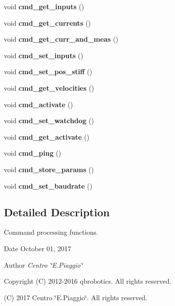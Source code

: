 \begin{DoxyCompactItemize}
void {\bfseries cmd\+\_\+get\+\_\+inputs} ()
\item 
\mbox{\label{command__processing_8h_aaf613e251c1e14fe4fffe3e9e033f9f7}} 
void {\bfseries cmd\+\_\+get\+\_\+currents} ()
\item 
\mbox{\label{command__processing_8h_a45a90a8455bfdb6a7f0e118da2c6f0a6}} 
void {\bfseries cmd\+\_\+get\+\_\+curr\+\_\+and\+\_\+meas} ()
\item 
\mbox{\label{command__processing_8h_a2d8a4542f55af960a27f875b00aad6a1}} 
void {\bfseries cmd\+\_\+set\+\_\+inputs} ()
\item 
\mbox{\label{command__processing_8h_a7897817859ac33d5a20b710af0f6a044}} 
void {\bfseries cmd\+\_\+set\+\_\+pos\+\_\+stiff} ()
\item 
\mbox{\label{command__processing_8h_a212883283bd7a8f32846615271cad8ce}} 
void {\bfseries cmd\+\_\+get\+\_\+velocities} ()
\item 
\mbox{\label{command__processing_8h_a107fc9f2982f9a953bdd82aa07279499}} 
void {\bfseries cmd\+\_\+activate} ()
\item 
\mbox{\label{command__processing_8h_aa94cd9c2e2fbfc5b98e84f67569cfe82}} 
void {\bfseries cmd\+\_\+set\+\_\+watchdog} ()
\item 
\mbox{\label{command__processing_8h_a554d563001517bfbc44400a1e999b393}} 
void {\bfseries cmd\+\_\+get\+\_\+activate} ()
\item 
\mbox{\label{command__processing_8h_a704f8c8cb0f4d75f243fc2b79bc34188}} 
void {\bfseries cmd\+\_\+ping} ()
\item 
\mbox{\label{command__processing_8h_a1a2493bfc2f30171d7e7a3bd5aebab14}} 
void {\bfseries cmd\+\_\+store\+\_\+params} ()
\item 
\mbox{\label{command__processing_8h_aa86bf1f2fa69ab5927f7e4e40eb40581}} 
void {\bfseries cmd\+\_\+set\+\_\+baudrate} ()
\end{DoxyCompactItemize}


\subsection{Detailed Description}
Command processing functions. 

\begin{DoxyDate}{Date}
October 01, 2017 
\end{DoxyDate}
\begin{DoxyAuthor}{Author}
{\itshape Centro \char`\"{}\+E.\+Piaggio\char`\"{}} 
\end{DoxyAuthor}
\begin{DoxyCopyright}{Copyright}
(C) 2012-\/2016 qbrobotics. All rights reserved. 

(C) 2017 Centro \char`\"{}\+E.\+Piaggio\char`\"{}. All rights reserved. 
\end{DoxyCopyright}


